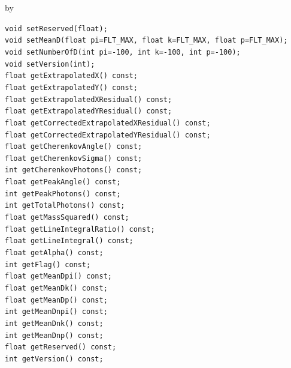 \documentclass[twoside]{article}
\newcommand{\entrylabel}[1]{\mbox{\textbf{{#1}}}\hfil}%
\newenvironment{entry}
{\begin{list}{}%
    {\renewcommand{\makelabel}{\entrylabel}%
     \setlength{\labelwidth}{90pt}%
     \setlength{\leftmargin}{\labelwidth}
     \advance\leftmargin by \labelsep%
      }%
    }%
  {\end{list}}
\newcommand{\Entrylabel}[1]%
{\raisebox{0pt}[1ex][0pt]{\makebox[\labelwidth][l]%
    {\parbox[t]{\labelwidth}{\hspace{0pt}\textbf{{#1}}}}}}
\newenvironment{Entry}%
{\renewcommand{\entrylabel}{\Entrylabel}\begin{entry}}%
  {\end{entry}}
\begin{document}
\begin{Entry}
    \verb+void setReserved(float);+\\
    \verb+void setMeanD(float pi=FLT_MAX, float k=FLT_MAX, float p=FLT_MAX);+\\
    \verb+void setNumberOfD(int pi=-100, int k=-100, int p=-100);+\\
    \verb+void setVersion(int);+\\
    \verb+float getExtrapolatedX() const;+\\
    \verb+float getExtrapolatedY() const;+\\
    \verb+float getExtrapolatedXResidual() const;+\\
    \verb+float getExtrapolatedYResidual() const;+\\
    \verb+float getCorrectedExtrapolatedXResidual() const;+\\
    \verb+float getCorrectedExtrapolatedYResidual() const;+\\
    \verb+float getCherenkovAngle() const;+\\
    \verb+float getCherenkovSigma() const;+\\
    \verb+int getCherenkovPhotons() const;+\\
    \verb+float getPeakAngle() const;+\\
    \verb+int getPeakPhotons() const;+\\
    \verb+int getTotalPhotons() const;+\\
    \verb+float getMassSquared() const;+\\
    \verb+float getLineIntegralRatio() const;+\\
    \verb+float getLineIntegral() const;+\\
    \verb+float getAlpha() const;+\\
    \verb+int getFlag() const;+\\
    \verb+float getMeanDpi() const;+\\
    \verb+float getMeanDk() const;+\\
    \verb+float getMeanDp() const;+\\
    \verb+int getMeanDnpi() const;+\\
    \verb+int getMeanDnk() const;+\\
    \verb+int getMeanDnp() const;+\\
    \verb+float getReserved() const;+\\
    \verb+int getVersion() const;+\\
\end{Entry}
\clearpage
\end{document}
